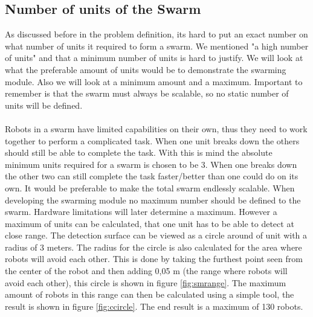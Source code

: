 \documentclass[10pt,a4paper]{article}
\begin{document}
\begin{table}[h]
\centering
{}
\caption{localization specification}
\label{smrange}
\end{table}



\subsection{Number of units of the Swarm}
As discussed before in the problem definition, its hard to put an exact number on what number of units it required to form a swarm. We mentioned "a high number of units" and that a minimum number of units is hard to justify. We will look at what the preferable amount of units would be to demonstrate the swarming module. Also we will look at a minimum amount and a maximum. Important to remember is that the swarm must always be scalable, so no static number of units will be defined.\\\\Robots in a swarm have limited capabilities on their own, thus they need to work together to perform a complicated task. When one unit breaks down the others should still be able to complete the task. With this is mind the absolute minimum units required for a swarm is chosen to be 3. When one breaks down the other two can still complete the task faster/better than one could do on its own. It would be preferable to make the total swarm endlessly scalable. When developing the swarming module no maximum number should be defined to the swarm. Hardware limitations will later determine a maximum. However a maximum of units can be calculated, that one unit has to be able to detect at close range. The detection surface can be viewed as a circle around of unit with a radius of 3 meters. The radius for the  circle is also calculated for the area where robots will avoid each other. This is done by taking the furthest point seen from the center of the robot and then adding 0,05 m (the range where robots will avoid each other), this circle is shown in figure \ref{fig:smrange}. The maximum amount of robots in this range can then be calculated using a simple tool, the result is shown in figure \ref{fig:ccircle}. The end result is a maximum of 130 robots.
\end{document}
